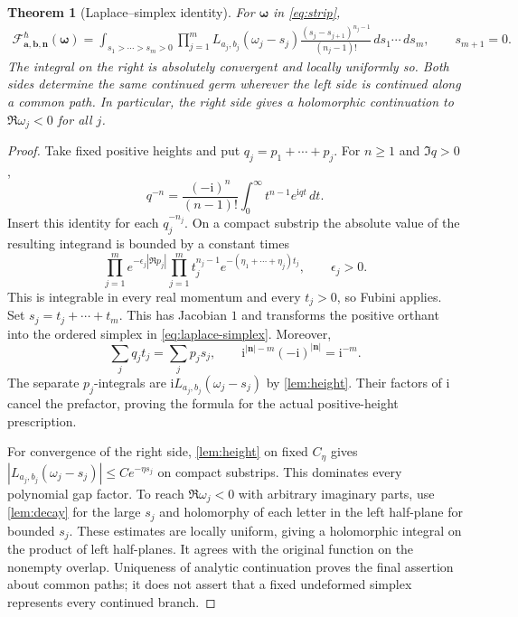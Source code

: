 \documentclass[11pt]{article}
\numberwithin{equation}{section}
\newtheorem{theorem}{Theorem}[section]
\theoremstyle{definition}
\theoremstyle{remark}
\newcommand{\dd}{\,d}
\newcommand{\ii}{\mathrm i}
\newcommand{\calF}{\mathcal F}
\newcommand{\qh}{\hbar}
\begin{document}
\begin{theorem}[Laplace--simplex identity]\label{thm:laplace}
For $\boldsymbol\omega$ in \eqref{eq:strip},
\begin{equation}\label{eq:laplace-simplex}
 \begin{split}
 \calF_{\mathbf a,\mathbf b,\mathbf n}^{\qh}(\boldsymbol\omega)
 =\int_{s_1>\cdots>s_m>0}
 \prod_{j=1}^m L_{a_j,b_j}(\omega_j-s_j)
 \frac{(s_j-s_{j+1})^{n_j-1}}{(n_j-1)!}
 \dd s_1\cdots\dd s_m,
 \qquad s_{m+1}=0.
 \end{split}
\end{equation}
The integral on the right is absolutely convergent and locally uniformly so.
Both sides determine the same continued germ wherever the left side is
continued along a common path. In particular, the right side gives a
holomorphic continuation to $\Re\omega_j<0$ for all $j$.
\end{theorem}
\begin{proof}
Take fixed positive heights and put $q_j=p_1+\cdots+p_j$.
For $n\geq1$ and $\Im q>0$,
\begin{equation}\label{eq:Laplaceone}
 q^{-n}=\frac{(-\ii)^n}{(n-1)!}
 \int_0^\infty t^{n-1}e^{\ii qt}\dd t.
\end{equation}
Insert this identity for each $q_j^{-n_j}$. On a compact substrip the absolute
value of the resulting integrand is bounded by a constant times
\begin{equation}\label{eq:Fubini-bound}
 \prod_{j=1}^m e^{-\epsilon_j|\Re p_j|}
 \prod_{j=1}^m t_j^{n_j-1}
 e^{-(\eta_1+\cdots+\eta_j)t_j},\qquad \epsilon_j>0.
\end{equation}
This is integrable in every real momentum and every $t_j>0$, so Fubini applies.
Set $s_j=t_j+\cdots+t_m$. This has Jacobian $1$ and transforms the positive
orthant into the ordered simplex in \eqref{eq:laplace-simplex}. Moreover,
\[
 \sum_jq_jt_j=\sum_jp_js_j,
 \qquad
 \ii^{|\mathbf n|-m}(-\ii)^{|\mathbf n|}=\ii^{-m}.
\]
The separate $p_j$-integrals are
$\ii L_{a_j,b_j}(\omega_j-s_j)$ by \cref{lem:height}. Their factors of $\ii$
cancel the prefactor, proving the formula for the actual positive-height
prescription.

For convergence of the right side, \cref{lem:height} on fixed $C_\eta$ gives
$|L_{a_j,b_j}(\omega_j-s_j)|\leq C e^{-\eta s_j}$ on compact substrips.
This dominates every polynomial gap factor. To reach
$\Re\omega_j<0$ with arbitrary imaginary parts, use \cref{lem:decay} for the
large $s_j$ and holomorphy of each letter in the left half-plane for bounded
$s_j$. These estimates are locally uniform, giving a holomorphic integral on
the product of left half-planes. It agrees with the original function on the
nonempty overlap. Uniqueness of analytic continuation proves the final
assertion about common paths; it does not assert that a fixed undeformed
simplex represents every continued branch.
\end{proof}
\end{document}
